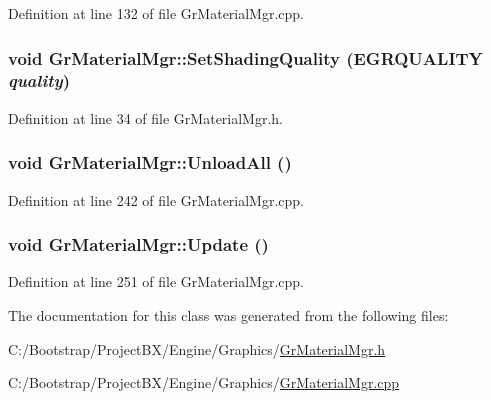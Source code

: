 Definition at line 132 of file GrMaterialMgr.cpp.\hypertarget{class_gr_material_mgr_1d585959cdac4e110fce8cdaa39310fa}{
\subsubsection[{SetShadingQuality}]{\setlength{\rightskip}{0pt plus 5cm}void GrMaterialMgr::SetShadingQuality ({\bf EGRQUALITY} {\em quality})}}
\label{class_gr_material_mgr_1d585959cdac4e110fce8cdaa39310fa}




Definition at line 34 of file GrMaterialMgr.h.\hypertarget{class_gr_material_mgr_24e6473a848193ef15400e817debc4a0}{
\subsubsection[{UnloadAll}]{\setlength{\rightskip}{0pt plus 5cm}void GrMaterialMgr::UnloadAll ()}}
\label{class_gr_material_mgr_24e6473a848193ef15400e817debc4a0}




Definition at line 242 of file GrMaterialMgr.cpp.\hypertarget{class_gr_material_mgr_fd6d9312e225637c1300dc0703c853f7}{
\subsubsection[{Update}]{\setlength{\rightskip}{0pt plus 5cm}void GrMaterialMgr::Update ()}}
\label{class_gr_material_mgr_fd6d9312e225637c1300dc0703c853f7}




Definition at line 251 of file GrMaterialMgr.cpp.

The documentation for this class was generated from the following files:\begin{CompactItemize}
\item 
C:/Bootstrap/ProjectBX/Engine/Graphics/\hyperlink{_gr_material_mgr_8h}{GrMaterialMgr.h}\item 
C:/Bootstrap/ProjectBX/Engine/Graphics/\hyperlink{_gr_material_mgr_8cpp}{GrMaterialMgr.cpp}\end{CompactItemize}
